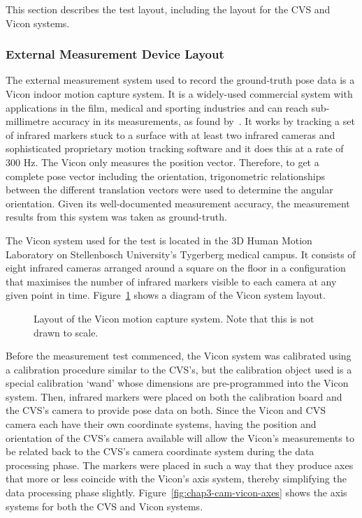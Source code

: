 This section describes the test layout, including the layout for the CVS and Vicon systems. 

\subsubsection{External Measurement Device Layout}

The external measurement system used to record the ground-truth pose data is a Vicon indoor motion capture system. It is a widely-used commercial system with applications in the film, medical and sporting industries and can reach sub-millimetre accuracy in its measurements, as found by~\cite{windolf2008systematic}. It works by tracking a set of infrared markers stuck to a surface with at least two infrared cameras and sophisticated proprietary motion tracking software and it does this at a rate of 300 Hz. The Vicon only measures the position vector. Therefore, to get a complete pose vector including the orientation, trigonometric relationships between the different translation vectors were used to determine the angular orientation. Given its well-documented measurement accuracy, the measurement results from this system was taken as ground-truth.

The Vicon system used for the test is located in the 3D Human Motion Laboratory on Stellenbosch University's Tygerberg medical campus. It consists of eight infrared cameras arranged around a square on the floor in a configuration that maximises the number of infrared markers visible to each camera at any given point in time. Figure~\ref{fig:chap3-vicon-layout} shows a diagram of the Vicon system layout. 
 
\begin{figure}
  \centering
  \def\svgwidth{0.5\textwidth}
  
  \caption[Layout of the Vicon motion capture system.]{Layout of the Vicon motion capture system. Note that this is not drawn to scale.}
\label{fig:chap3-vicon-layout}
\end{figure}

Before the measurement test commenced, the Vicon system was calibrated using a calibration procedure similar to the CVS's, but the calibration object used is a special calibration `wand' whose dimensions are pre-programmed into the Vicon system. Then, infrared markers were placed on both the calibration board and the CVS's camera to provide pose data on both. Since the Vicon and CVS camera each have their own coordinate systems, having the position and orientation of the CVS's camera available will allow the Vicon's measurements to be related back to the CVS's camera coordinate system during the data processing phase. The markers were placed in such a way that they produce axes that more or less coincide with the Vicon's axis system, thereby simplifying the data processing phase slightly. Figure~\ref{fig:chap3-cam-vicon-axes} shows the axis systems for both the CVS and Vicon systems.

